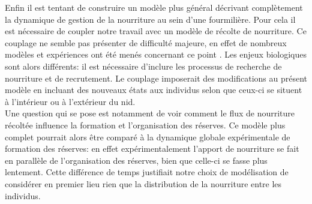 Enfin il est tentant de construire un modèle plus général décrivant complètement la dynamique de gestion de la nourriture au sein d'une fourmilière. Pour cela il est nécessaire de coupler notre travail avec un modèle de récolte de nourriture. Ce couplage ne semble pas présenter de difficulté majeure, en effet de nombreux modèles et expériences ont été menés concernant ce point \citep{sumpter_collective_2010}. Les enjeux biologiques sont alors différents: il est nécessaire d'inclure les processus de recherche de nourriture et de recrutement. Le couplage imposerait des modifications au présent modèle en incluant des nouveaux états aux individus selon que ceux-ci se situent à l'intérieur ou à l'extérieur du nid.\\

Une question qui se pose est notamment de voir comment le flux de nourriture récoltée influence la formation et l'organisation des réserves. Ce modèle plus complet pourrait alors être comparé à la dynamique globale expérimentale de formation des réserves: en effet expérimentalement l'apport de nourriture se fait en parallèle de l'organisation des réserves, bien que celle-ci se fasse plus lentement. Cette différence de temps justifiait notre choix de modélisation de considérer en premier lieu rien que la distribution de la nourriture entre les individus.\\


